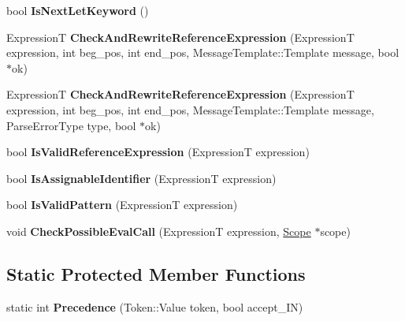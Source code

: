 \begin{DoxyCompactItemize}
\item 
bool {\bfseries Is\+Next\+Let\+Keyword} ()\hypertarget{classv8_1_1internal_1_1_parser_base_aedeac11fabae37ecd19e511308bab6c3}{}\label{classv8_1_1internal_1_1_parser_base_aedeac11fabae37ecd19e511308bab6c3}

\item 
ExpressionT {\bfseries Check\+And\+Rewrite\+Reference\+Expression} (ExpressionT expression, int beg\+\_\+pos, int end\+\_\+pos, Message\+Template\+::\+Template message, bool $\ast$ok)\hypertarget{classv8_1_1internal_1_1_parser_base_afb763b2794109bf8f21382cff25ae3c2}{}\label{classv8_1_1internal_1_1_parser_base_afb763b2794109bf8f21382cff25ae3c2}

\item 
ExpressionT {\bfseries Check\+And\+Rewrite\+Reference\+Expression} (ExpressionT expression, int beg\+\_\+pos, int end\+\_\+pos, Message\+Template\+::\+Template message, Parse\+Error\+Type type, bool $\ast$ok)\hypertarget{classv8_1_1internal_1_1_parser_base_a5bc542637a3b12659b06afe4351a8306}{}\label{classv8_1_1internal_1_1_parser_base_a5bc542637a3b12659b06afe4351a8306}

\item 
bool {\bfseries Is\+Valid\+Reference\+Expression} (ExpressionT expression)\hypertarget{classv8_1_1internal_1_1_parser_base_a7cce6234ee457bcb3cb824d75091840f}{}\label{classv8_1_1internal_1_1_parser_base_a7cce6234ee457bcb3cb824d75091840f}

\item 
bool {\bfseries Is\+Assignable\+Identifier} (ExpressionT expression)\hypertarget{classv8_1_1internal_1_1_parser_base_a5124ec03efd6e4913f3a7cc21d095525}{}\label{classv8_1_1internal_1_1_parser_base_a5124ec03efd6e4913f3a7cc21d095525}

\item 
bool {\bfseries Is\+Valid\+Pattern} (ExpressionT expression)\hypertarget{classv8_1_1internal_1_1_parser_base_a826c87bd018b2a7153f993578431ccb4}{}\label{classv8_1_1internal_1_1_parser_base_a826c87bd018b2a7153f993578431ccb4}

\item 
void {\bfseries Check\+Possible\+Eval\+Call} (ExpressionT expression, \hyperlink{classv8_1_1internal_1_1_scope}{Scope} $\ast$scope)\hypertarget{classv8_1_1internal_1_1_parser_base_a8694cf90997df85ec499d658f3f58d36}{}\label{classv8_1_1internal_1_1_parser_base_a8694cf90997df85ec499d658f3f58d36}

\end{DoxyCompactItemize}
\subsection*{Static Protected Member Functions}
\begin{DoxyCompactItemize}
\item 
static int {\bfseries Precedence} (Token\+::\+Value token, bool accept\+\_\+\+IN)\hypertarget{classv8_1_1internal_1_1_parser_base_a1ef51a4dddedfda66da7d65ea33f82b2}{}\label{classv8_1_1internal_1_1_parser_base_a1ef51a4dddedfda66da7d65ea33f82b2}

\end{DoxyCompactItemize}
